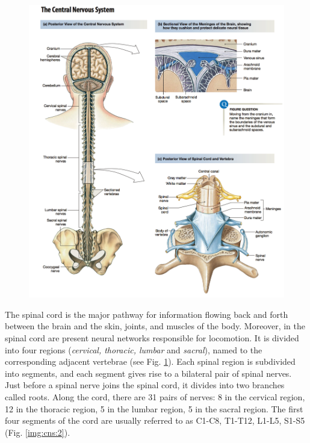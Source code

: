 \documentclass[a4paper,11pt,openright,twoside]{book}
\begin{document}
\begin{figure}[h!]
\centering
\includegraphics[width=\textwidth]{images/spinal_cord}
\label{img:cns:1}
\end{figure}

\newpage

The spinal cord is the major pathway for information flowing back and forth between the brain and the skin, joints, and muscles of the body. Moreover, in the spinal cord are present neural networks responsible for locomotion. It is divided into four regions (\emph{cervical, thoracic, lumbar} and \emph{sacral}), named to the corresponding adjacent vertebrae (see Fig. \ref{img:cns:1}). Each spinal region is subdivided into segments, and each segment gives rise to a bilateral pair of spinal nerves. Just before a spinal nerve joins the spinal cord, it divides into two branches called roots. Along the cord, there are 31 pairs of nerves: 8 in the cervical region, 12 in the thoracic region, 5 in the lumbar region, 5 in the sacral region. The first four segments of the cord are usually referred to as C1-C8, T1-T12, L1-L5, S1-S5 (Fig. \ref{img:cns:2}).
\end{document}
